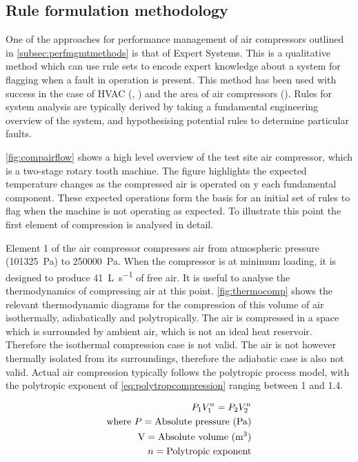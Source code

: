 \subsection{Rule formulation methodology}
\label{subsec:rulemethodology}

One of the approaches for performance management of air compressors outlined in \autoref{subsec:perfmgmtmethods} is that of Expert Systems. This is a qualitative method which can use rule sets to encode expert knowledge about a system for flagging when a fault in operation is present. This method has been used with success in the case of HVAC (\cite{Bruton2014}, \cite{House2001}) and the area of air compressors (\cite{Liu2001}). Rules for system analysis are typically derived by taking a fundamental engineering overview of the system, and hypothesising potential rules to determine particular faults.

\autoref{fig:compairflow} shows a high level overview of the test site air compressor, which is a two-stage rotary tooth machine. The figure highlights the expected temperature changes as the compressed air is operated on y each fundamental component. These expected operations form the basis for an initial set of rules to flag when the machine is not operating as expected. To illustrate this point the first element of compression is analysed in detail.

Element 1 of the air compressor compresses air from atmospheric pressure (\SI{101325}{\pascal}) to \SI{250000}{\pascal}. When the compressor is at minimum loading, it is designed to produce \SI{41}{\liter \per \second} of free air. It is useful to analyse the thermodynamics of compressing air at this point. \autoref{fig:thermocomp} shows the relevant thermodynamic diagrams for the compression of this volume of air isothermally, adiabatically and polytropically. The air is compressed in a space which is surrounded by ambient air, which is not an ideal heat reservoir. Therefore the isothermal compression case is not valid. The air is not however thermally isolated from its surroundings, therefore the adiabatic case is also not valid. Actual air compression typically follows the polytropic process model, with the polytropic exponent of \autoref{eq:polytropcompression} ranging between 1 and 1.4.

\begin{eqnarray}
\label{eq:polytropcompression}
P_1 V_1^n = P_2 V_2^n \\
\text{where}~P = \text{Absolute pressure (Pa)} \nonumber \\
\text{V} = \text{Absolute volume (m\textsuperscript{3})} \nonumber \\ 
n = \text{Polytropic exponent} \nonumber
\end{eqnarray} 

